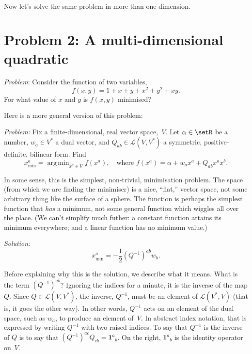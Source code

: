 \documentclass[10pt, a4paper]{article}
\newcommand{\id}{\mathbold{1}}
\DeclareMathOperator*{\argmin}{arg\,min}
\begin{document}
Now let's solve the same problem in more than one dimension.

\section{Problem 2: A multi-dimensional quadratic}

\emph{Problem}: Consider the function of two variables, 
\begin{equation*}
  f(x,y) = 1 + x + y + x^2 + y^2 + xy. 
\end{equation*}
For what value of $x$ and $y$ is $f(x,y)$ minimised?

Here is a more general version of this problem:

\emph{Problem:} Fix a finite-dimensional, real vector space,~$V$. Let
$\alpha\in\setR$ be a number, $w_a\in V^*$ a dual vector, and
$Q_{ab} \in \mathcal{L}(V,V^*)$ a symmetric, positive-definite, bilinear
form. Find
\begin{equation*}
x^a_\text{min} = \argmin_{x^a\in V} f(x^a),\quad\text{where $f(x^a) = \alpha + w_ax^a + Q_{ab}x^ax^b$}.
\end{equation*}

In some sense, this is the simplest, non-trivial, minimisation
problem. The space (from which we are finding the minimiser) is a
nice, “flat,” vector space, not some arbitrary thing like the surface
of a sphere. The function is perhaps the simplest function that
\emph{has} a minimum, not some general function which wiggles all over
the place. (We can't simplify much futher: a constant function attains
its minimum everywhere; and a linear function has no minimum value.)

\emph{Solution:}
\begin{equation}
  x^a_\text{min} = -\frac{1}{2} {(Q^{-1})}^{ab}w_b.
\label{eq:sol-quadr-vect}
\end{equation}

Before explaining why this is the solution, we describe what it
means. What is the term ${(Q^{-1})}^{ab}$? Ignoring the indices for a
minute, it is the inverse of the map $Q$. Since
$Q\in\mathcal{L}(V, V^*)$, the inverse, $Q^{-1}$, must be an element of
$\mathcal{L}(V^*, V)$ (that is, it goes the other way). In other words,
$Q^{-1}$ acts on an element of the dual space, such as $w_a$, to
produce an element of~$V$. In abstract index notation, that is
expressed by writing $Q^{-1}$ with two raised indices. To say that
$Q^{-1}$ is the inverse of $Q$ is to say that
${(Q^{-1})}^{ac}Q_{cb} = \id^a{}_b$. On the right, $\id^a{}_b$ is the
identity operator on~$V$.
\end{document}
